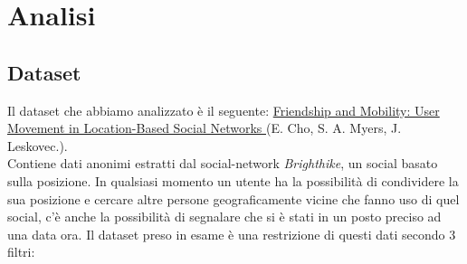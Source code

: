 \documentclass[a4paper]{article}
\begin{document}
\section{Analisi}
\subsection{Dataset}
Il dataset che abbiamo analizzato è il seguente: \href{http://snap.stanford.edu/data/loc-brightkite.html}{ Friendship and Mobility: User Movement in Location-Based Social Networks }(E. Cho, S. A. Myers, J. Leskovec.).\\
Contiene dati anonimi estratti dal social-network \textit{Brighthike}, un social basato sulla posizione.
In qualsiasi momento un utente ha la possibilità di condividere la sua posizione e cercare altre persone geograficamente vicine che fanno uso di quel social, c'è anche la possibilità di segnalare che si è stati in un posto preciso ad una data ora.
Il dataset preso in esame è una restrizione di questi dati secondo 3 filtri:
\end{document}
